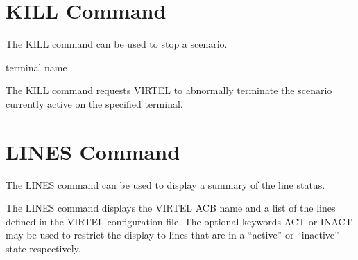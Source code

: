 \documentclass[letterpaper,10pt,english]{sphinxmanual}
\begin{document}
\newpage

\ignorespaces 

\section{KILL Command}
\label{\detokenize{audit_operations_ and_performance:kill-command}}\label{\detokenize{audit_operations_ and_performance:index-3}}
\sphinxAtStartPar
The KILL command can be used to stop a scenario.

\begin{sphinxVerbatim}[commandchars=\\\{\}]
\end{sphinxVerbatim}
\begin{description}
\sphinxAtStartPar
terminal name

\end{description}

\sphinxAtStartPar
The KILL command requests VIRTEL to abnormally terminate the scenario currently active on the specified terminal.

\ignorespaces 

\section{LINES Command}
\label{\detokenize{audit_operations_ and_performance:lines-command}}\label{\detokenize{audit_operations_ and_performance:index-4}}
\sphinxAtStartPar
The LINES command can be used to display a summary of the line status.

\begin{sphinxVerbatim}[commandchars=\\\{\}]
    
\end{sphinxVerbatim}

\sphinxAtStartPar
The LINES command displays the VIRTEL ACB name and a list of the lines defined in the VIRTEL configuration file. The optional keywords ACT or INACT may be used to restrict the display to lines that are in a “active” or “inactive” state respectively.
\end{document}

